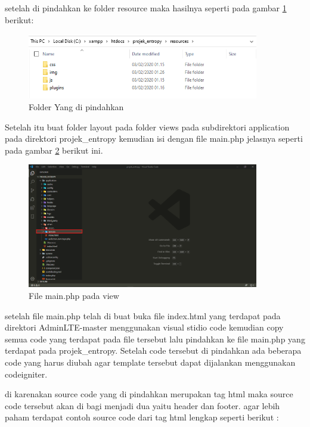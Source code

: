 setelah di pindahkan ke folder resource maka hasilnya seperti pada gambar \ref{tmp3} berikut:

\begin{figure}[!htbp]
	\centerline{\includegraphics[width=0.90\textwidth]{figures/tmp/3.png}}
	\caption{Folder Yang di pindahkan}
	\label{tmp3}
\end{figure}
	
\pagebreak
Setelah itu buat folder layout pada folder views pada subdirektori application pada direktori projek\_entropy kemudian isi dengan file main.php jelasnya seperti pada gambar \ref{tmp4} berikut ini.

\begin{figure}[!htbp]
	\centerline{\includegraphics[width=0.90\textwidth]{figures/tmp/6.png}}
	\caption{File main.php pada view}
	\label{tmp4}
\end{figure}

setelah file main.php telah di buat buka file index.html yang terdapat pada direktori AdminLTE-master menggunakan visual stidio code kemudian copy semua code yang terdapat pada file tersebut lalu pindahkan ke file main.php yang terdapat pada projek\_entropy. Setelah code tersebut di pindahkan ada beberapa code yang harus diubah agar template tersebut dapat dijalankan menggunakan codeigniter.

di karenakan source code yang di pindahkan merupakan tag html maka source code tersebut akan di bagi menjadi dua yaitu header dan footer. agar lebih paham terdapat contoh source code dari tag html lengkap seperti berikut :

